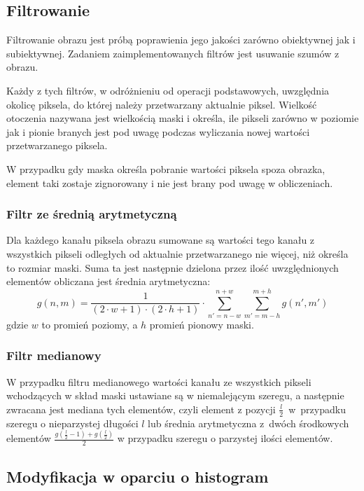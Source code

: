 \documentclass{classrep}
\begin{document}
\subsection{Filtrowanie}
Filtrowanie obrazu jest próbą poprawienia jego jakości \ppauza zarówno obiektywnej jak i subiektywnej. Zadaniem zaimplementowanych filtrów jest usuwanie szumów z obrazu.

Każdy z tych filtrów, w odróżnieniu od operacji podstawowych, uwzględnia okolicę piksela, do której należy przetwarzany aktualnie piksel. Wielkość otoczenia nazywana jest wielkością maski i określa, ile pikseli zarówno w poziomie jak i pionie branych jest pod uwagę podczas wyliczania nowej wartości przetwarzanego piksela.

W przypadku gdy maska określa pobranie wartości piksela spoza obrazka, element taki zostaje zignorowany i nie jest brany pod uwagę w obliczeniach.

\subsubsection{Filtr ze średnią arytmetyczną}
Dla każdego kanału piksela obrazu sumowane są wartości tego kanału z wszystkich pikseli odległych od aktualnie przetwarzanego nie więcej, niż określa to rozmiar maski. Suma ta jest następnie dzielona przez ilość uwzględnionych elementów \ppauza obliczana jest średnia arytmetyczna:
\begin{equation}
 g(n, m) = \frac{1}{(2 \cdot w + 1) \cdot (2 \cdot h + 1)} \cdot \displaystyle \sum \limits_{n' = n - w}^{n + w} \displaystyle \sum \limits_{m' = m - h}^{m + h} g(n', m')
\end{equation}
gdzie $w$ to promień poziomy, a $h$ promień pionowy maski.

\subsubsection{Filtr medianowy}
W przypadku filtru medianowego wartości kanału ze wszystkich pikseli wchodzących w skład maski ustawiane są w niemalejącym szeregu, a następnie zwracana jest mediana tych elementów, czyli element z pozycji $\frac{l}{2}$~w~przypadku szeregu o nieparzystej długości $l$ lub średnia arytmetyczna z~dwóch środkowych elementów $\frac{g(\frac{l}{2} - 1) + g(\frac{l}{2})}{2}$ w przypadku szeregu o parzystej ilości elementów.

\subsection{Modyfikacja w oparciu o histogram}
\end{document}
